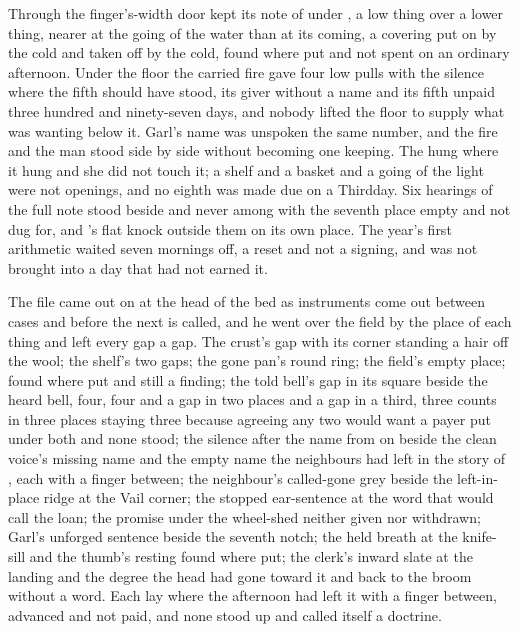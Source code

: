 Through the finger's-width door  kept its note of  under , a low thing over a lower thing, nearer at the going of the water than at its coming, a covering put on by the cold and taken off by the cold, found where put and not spent on an ordinary afternoon. Under the floor the carried fire gave four low pulls with the silence where the fifth should have stood, its giver without a name and its fifth unpaid three hundred and ninety-seven days, and nobody lifted the floor to supply what was wanting below it. Garl's name was unspoken the same number, and the fire and the man stood side by side without becoming one keeping. The  hung where it hung and she did not touch it; a shelf and a basket and a going of the light were not openings, and no eighth was made due on a Thirdday. Six hearings of the full note stood beside and never among with the seventh place empty and not dug for, and 's flat knock outside them on its own place. The year's first arithmetic waited seven mornings off, a reset and not a signing, and was not brought into a day that had not earned it.

The file came out on  at the head of the bed as instruments come out between cases and before the next is called, and he went over the field by the place of each thing and left every gap a gap. The crust's gap with its corner standing a hair off the wool; the shelf's two gaps; the gone pan's round ring; the field's empty place;  found where put and still a finding; the told bell's gap in its square beside the heard bell, four, four and a gap in two places and a gap in a third, three counts in three places staying three because agreeing any two would want a payer put under both and none stood; the silence after the name from  on  beside the clean voice's missing name and the empty name the neighbours had left in the story of , each with a finger between; the neighbour's called-gone grey beside the left-in-place ridge at the Vail corner; the stopped ear-sentence at the word that would call the loan; the promise under the wheel-shed neither given nor withdrawn; Garl's unforged sentence beside the seventh notch; the held breath at the knife-sill and the thumb's resting found where put; the clerk's inward slate at the landing and the degree the head had gone toward it and back to the broom without a word. Each lay where the afternoon had left it with a finger between, advanced and not paid, and none stood up and called itself a doctrine.

